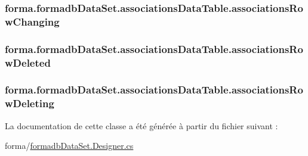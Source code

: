 \subsubsection[{\texorpdfstring{associations\+Row\+Changing}{associationsRowChanging}}]{ forma.\+formadb\+Data\+Set.\+associations\+Data\+Table.\+associations\+Row\+Changing}\hypertarget{classforma_1_1formadb_data_set_1_1associations_data_table_ad7c46ad897da07820260100321351eb2}{}\label{classforma_1_1formadb_data_set_1_1associations_data_table_ad7c46ad897da07820260100321351eb2}
\subsubsection[{\texorpdfstring{associations\+Row\+Deleted}{associationsRowDeleted}}]{ forma.\+formadb\+Data\+Set.\+associations\+Data\+Table.\+associations\+Row\+Deleted}\hypertarget{classforma_1_1formadb_data_set_1_1associations_data_table_a322b2488c3bffbe4e029d799e04ac419}{}\label{classforma_1_1formadb_data_set_1_1associations_data_table_a322b2488c3bffbe4e029d799e04ac419}
\subsubsection[{\texorpdfstring{associations\+Row\+Deleting}{associationsRowDeleting}}]{ forma.\+formadb\+Data\+Set.\+associations\+Data\+Table.\+associations\+Row\+Deleting}\hypertarget{classforma_1_1formadb_data_set_1_1associations_data_table_af8d6d7f888774fbeaa2adefb87e2e137}{}\label{classforma_1_1formadb_data_set_1_1associations_data_table_af8d6d7f888774fbeaa2adefb87e2e137}


La documentation de cette classe a été générée à partir du fichier suivant \+:\begin{DoxyCompactItemize}
\item 
forma/\hyperlink{formadb_data_set_8_designer_8cs}{formadb\+Data\+Set.\+Designer.\+cs}\end{DoxyCompactItemize}
